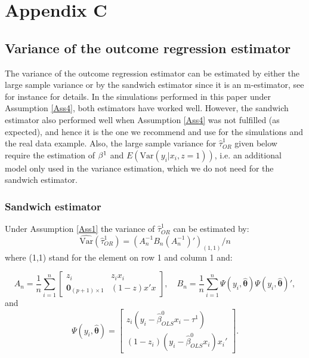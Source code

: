 \documentclass[11pt]{article}
\newcommand{\Var}{{\mbox{Var}}}
\newcommand{\bbeta}{{\bf \beta}}
\begin{document}
\section*{Appendix C}
\subsection*{Variance of the outcome regression estimator}
The variance of the outcome regression estimator can be estimated by either the large sample variance or by the sandwich estimator since it is an m-estimator, see for instance \cite{Stefanski:2002} for details. In the simulations performed in this paper under Assumption \ref{Ass4}, both estimators have worked well. However, the sandwich estimator also performed well when Assumption \ref{Ass4} was not fulfilled (as expected), and hence it is the one we recommend and use for the simulations and the real data example. Also, the large sample variance for $\hat\tau_{OR}^1$ given below require the estimation of $\bbeta^1$ and $E\left(\mbox{Var}(y_i|x_i, z=1)\right)$, i.e. an additional model only used in the variance estimation, which we do not need for the sandwich estimator. 
\subsubsection*{Sandwich estimator}

\noindent Under Assumption \ref{Ass1} the variance of $\hat \tau_{OR}^1$ can be estimated by:
$$\widehat{\Var}(\hat{\tau}^1_{OR}) = (A_n^{-1} B_n (A_n^{-1})' )_{(1,1)}/ n$$
where (1,1) stand for the element on row 1 and column 1 and:


\begin{equation*}
A_n=\frac{1}{n}\sum \limits_{i =1}^n\left[
\begin{matrix}
z_i& z_i x_i  \\
\boldsymbol 0_{(p+1)\times1}&(1-z)x' x \end{matrix} \right], \quad B_n=\frac{1}{n}\sum \limits_{i =1}^n\Psi (y_i,  \boldsymbol{ \hat{\theta}})\Psi (y_i,  \boldsymbol{ \hat{\theta}})',
\end{equation*}
and
\begin{equation*}
\Psi (y_i,  \boldsymbol{ \hat{\theta}}) =\left[
\begin{matrix}
z_i(y_i- \hat \beta^0_{OLS}x_i -\tau^1) \\
(1-z_i)(y_i- \hat \beta^0_{OLS}x_i) x_i' 
\end{matrix} \right].
\end{equation*}
\vspace{2mm}
\end{document}
